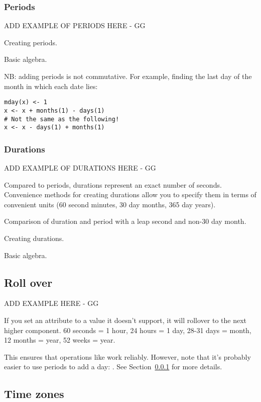 \documentclass[article]{jss}
\begin{document}
\subsubsection{Periods}
\label{sec:periods}

ADD EXAMPLE OF PERIODS HERE - GG

Creating periods.  

Basic algebra.

NB: adding periods is not commutative. For example, finding the last day of the month in which each date lies:

\begin{verbatim}
mday(x) <- 1
x <- x + months(1) - days(1)
# Not the same as the following!
x <- x - days(1) + months(1) 
\end{verbatim}


\subsubsection{Durations}
\label{sec:durations}

ADD EXAMPLE OF DURATIONS HERE - GG

Compared to periods, durations represent an exact number of seconds.  Convenience methods for creating durations allow you to specify them in terms of convenient units (60 second minutes, 30 day months, 365 day years).  

Comparison of duration and period with a leap second and non-30 day month.

Creating durations.

Basic algebra.


\subsection{Roll over}

ADD EXAMPLE HERE - GG

If you set an attribute to a value it doesn't support, it will rollover to the next higher component.  60 seconds = 1 hour, 24 hours = 1 day, 28-31 days = month, 12 months = year, 52 weeks = year.  

This ensures that operations like  work reliably.  However, note that it's probably easier to use periods to add a day: .  See Section~\ref{sec:periods} for more details.

\subsection{Time zones}
\end{document}
